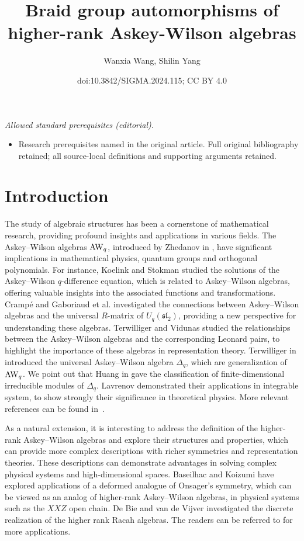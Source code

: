 \documentclass[10pt,a4paper]{amsart}
\title{Braid group automorphisms of higher-rank Askey-Wilson algebras}
\author{Wanxia Wang, Shilin Yang}
\date{doi:10.3842/SIGMA.2024.115; CC BY 4.0}
\numberwithin{equation}{section}
\begin{document}
\maketitle
\noindent\textit{Allowed standard prerequisites (editorial).}\begin{itemize}
\item Research prerequisites named in the original article. Full original bibliography retained; all source-local definitions and supporting arguments retained.
\end{itemize}\medskip
\section{Introduction}
The study of algebraic structures has been a cornerstone of mathematical research, providing profound insights and applications in various fields.
The Askey--Wilson algebras ${\rm AW}_q$, introduced by Zhedanov in \cite{Zhe(1991)}, have significant implications in mathematical physics, quantum groups and orthogonal polynomials.
For instance, Koelink and Stokman \cite{KS(2001)} studied the solutions of the Askey--Wilson $q$-difference equation, which is related to Askey--Wilson algebras, offering valuable insights into the associated functions and transformations.
Cramp\'{e} and Gaboriaud et al. \cite{CGVZ(2020)} investigated the connections between Askey--Wilson algebras and the universal $R$-matrix of $U_q(\mathfrak{sl}_2)$, providing a new perspective for understanding these algebras.
Terwilliger and Vidunas \cite{TV(2004)} studied the relationships between the Askey--Wilson algebras and the corresponding Leonard pairs, to highlight the importance of these algebras in representation theory.
Terwilliger in \cite{Ter(2011)} introduced the universal Askey--Wilson algebra $\Delta_q$, which are generalization of ${\rm AW}_q$.
We point out that Huang in \cite{Huang(2015),Huang(2021)} gave the classification of finite-dimensional irreducible modules of $\Delta_q$.
Lavrenov \cite{Lav(1997)} demonstrated their applications in integrable system, to show strongly their significance in theoretical physics.
More relevant references can be found in~\cite{CFGPRV(2021),CVZ(2021),GW(2023),Koor(2007),Koor(2008)}.

As a natural extension, it is interesting to address the definition of the higher-rank
Askey--Wilson algebras and explore their structures and properties, which can provide more complex descriptions with richer symmetries and representation theories.
These descriptions can demonstrate advantages in solving complex physical systems and high-dimensional spaces.
Baseilhac and Koizumi \cite{BK(2005)} have explored applications of a deformed analogue of Onsager's symmetry,
which can be viewed as an analog of higher-rank Askey--Wilson algebras, in physical systems such as the $XXZ$ open chain.
De Bie and van de Vijver \cite{DV(2020)} investigated the discrete realization of the higher rank Racah algebras.
The readers can be referred to \cite{CL(2022),DDV(2020),De(2019),PW(2017)} for more applications.
\end{document}
